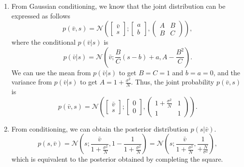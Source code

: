 \begin{enumerate}[label=\alph*.]
\item From Gaussian conditioning, we know that the joint distribution can be expressed as follows
\begin{equation}
p(\bar{v},s) = \mathcal{N}\left( \left[\begin{array}{c}
\bar{v}\\
s
\end{array}\right]; \left[\begin{array}{c}
a\\
b
\end{array}\right], \left(\begin{array}{cc}
A & B\\
B & C
\end{array}\right) \right),
\end{equation}
where the conditional $p(\bar{v}|s)$ is
\begin{equation}
p(\bar{v}|s) = \mathcal{N}\left(\bar{v}; \frac{B}{C}(s-b) + a,A - \frac{B^2}{C}\right).
\end{equation}
We can use the mean from $p(\bar{v}|s)$ to get $B=C=1$ and $b=a=0$, and the variance from $p(\bar{v}|s)$ to get $A=1 + \frac{\sigma^2}{N}$. Thus, the joint probability $p(\bar{v},s)$ is
\begin{equation}
p(\bar{v},s) = \mathcal{N}\left( \left[\begin{array}{c}
\bar{v}\\
s
\end{array}\right]; \left[\begin{array}{c}
0\\
0
\end{array}\right], \left(\begin{array}{cc}
1 + \frac{\sigma^2}{N} & 1\\
1 & 1
\end{array}\right) \right).
\end{equation}

\item From conditioning, we can obtain the posterior distribution $p(s| \bar{v})$.
\begin{equation}
p(s, \bar{v}) = \mathcal{N}\left(s; \frac{\bar{v}}{1 + \frac{\sigma^2}{N}}, 1 - \frac{1}{1 + \frac{\sigma^2}{N}}\right) = \mathcal{N}\left(s; \frac{\bar{v}}{1 + \frac{\sigma^2}{N}}, \frac{1}{ + \frac{N}{\sigma^2}}\right),
\end{equation}
which is equivalent to the posterior obtained by completing the square.

\end{enumerate}





